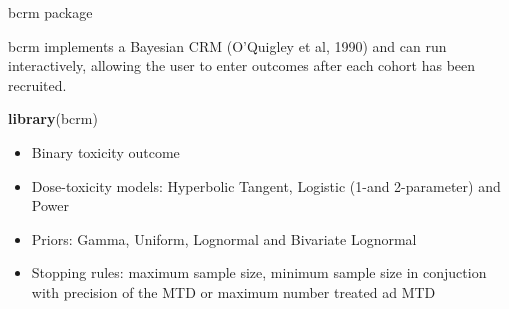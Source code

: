 \documentclass{beamer}
\newenvironment{Shaded}{}{}
\newcommand{\KeywordTok}[1]{\textcolor[rgb]{0.00,0.44,0.13}{\textbf{{#1}}}}
\newcommand{\NormalTok}[1]{{#1}}
\begin{document}
\begin{frame}[fragile]{bcrm package}

bcrm implements a Bayesian CRM (O'Quigley et al, 1990) and can run
interactively, allowing the user to enter outcomes after each cohort has
been recruited.

\begin{Shaded}
\begin{Highlighting}[]
\KeywordTok{library}\NormalTok{(bcrm)}
\end{Highlighting}
\end{Shaded}

\begin{itemize}
\itemsep1pt\parskip0pt
\item
  Binary toxicity outcome
\item
  Dose-toxicity models: Hyperbolic Tangent, Logistic (1-and 2-parameter)
  and Power
\item
  Priors: Gamma, Uniform, Lognormal and Bivariate Lognormal
\item
  Stopping rules: maximum sample size, minimum sample size in conjuction
  with precision of the MTD or maximum number treated ad MTD
\end{itemize}

\end{frame}
\end{document}
